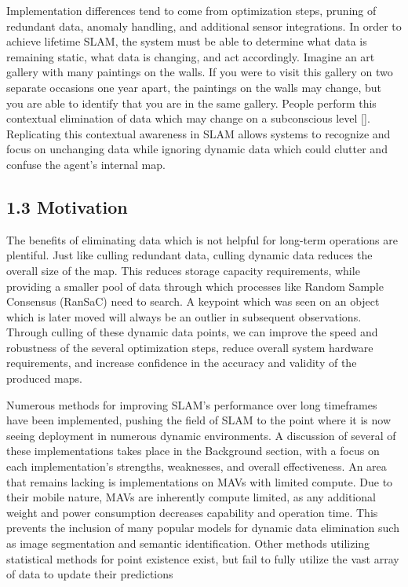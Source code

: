 \documentclass[12pt]{article}
\begin{document}
Implementation differences tend to come from optimization steps, pruning of redundant data, anomaly handling, and additional sensor integrations. In order to achieve lifetime SLAM, the system must be able to determine what data is remaining static, what data is changing, and act accordingly. Imagine an art gallery with many paintings on the walls. If you were to visit this gallery on two separate occasions one year apart, the paintings on the walls may change, but you are able to identify that you are in the same gallery. People perform this contextual elimination of data which may change on a subconscious level []. Replicating this contextual awareness in SLAM allows systems to recognize and focus on unchanging data while ignoring dynamic data which could clutter and confuse the agent's internal map.

\subsection{1.3 Motivation}

The benefits of eliminating data which is not helpful for long-term operations are plentiful. Just like culling redundant data, culling dynamic data reduces the overall size of the map. This reduces storage capacity requirements, while providing a smaller pool of data through which processes like Random Sample Consensus (RanSaC) need to search. A keypoint which was seen on an object which is later moved will always be an outlier in subsequent observations. Through culling of these dynamic data points, we can improve the speed and robustness of the several optimization steps, reduce overall system hardware requirements, and increase confidence in the accuracy and validity of the produced maps.

Numerous methods for improving SLAM's performance over long timeframes have been implemented, pushing the field of SLAM to the point where it is now seeing deployment in numerous dynamic environments. A discussion of several of these implementations takes place in the Background section, with a focus on each implementation's strengths, weaknesses, and overall effectiveness. An area that remains lacking is implementations on MAVs with limited compute. Due to their mobile nature, MAVs are inherently compute limited, as any additional weight and power consumption decreases capability and operation time. This prevents the inclusion of many popular models for dynamic data elimination such as image segmentation and semantic identification. Other methods utilizing statistical methods for point existence exist, but fail to fully utilize the vast array of data to update their predictions
\end{document}
